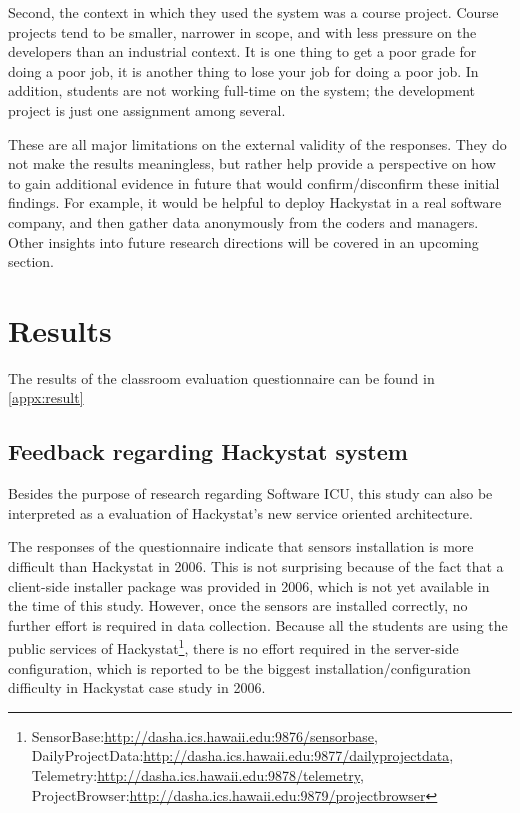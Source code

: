 Second, the context in which they used the system was a course project.  Course projects tend to be smaller, narrower in scope, and with less pressure on the developers than an industrial context.  It is one thing to get a poor grade for doing a poor job, it is another thing to lose your job for doing a poor job.  In addition, students are not working full-time on the system; the development project is just one assignment among several.  

These are all major limitations on the external validity of the responses.  They do not make the results meaningless, but rather help provide a perspective on how to gain additional evidence in future that would confirm/disconfirm these initial findings.  For example, it would be helpful to deploy Hackystat in a real software company, and then gather data anonymously from the coders and managers. Other insights into future research directions will be covered in an upcoming section.

\chapter {Results}

The results of the classroom evaluation questionnaire can be found in \autoref{appx:result}

\section {Feedback regarding Hackystat system}
Besides the purpose of research regarding Software ICU, this study can also be interpreted as a evaluation of Hackystat's new service oriented architecture.

The responses of the questionnaire indicate that sensors installation is more difficult than Hackystat in 2006. This is not surprising because of the fact that a client-side installer package was provided in 2006, which is not yet available in the time of this study. However, once the sensors are installed correctly, no further effort is required in data collection. Because all the students are using the public services of Hackystat\footnote{SensorBase:\url{http://dasha.ics.hawaii.edu:9876/sensorbase}, DailyProjectData:\url{http://dasha.ics.hawaii.edu:9877/dailyprojectdata}, Telemetry:\url{http://dasha.ics.hawaii.edu:9878/telemetry}, ProjectBrowser:\url{http://dasha.ics.hawaii.edu:9879/projectbrowser}}, there is no effort required in the server-side configuration, which is reported to be the biggest installation/configuration difficulty in Hackystat case study in 2006.

